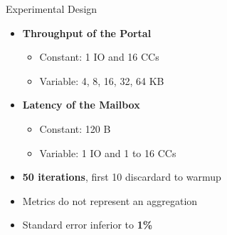 	\begin{frame}[fragile]{Experimental Design}
		\begin{itemize}
			\item \textbf{Throughput of the Portal}
			\begin{itemize}
				\item Constant: 1 IO and 16 CCs
				\item Variable: 4, 8, 16, 32, 64 KB
			\end{itemize}
		\end{itemize}

		\begin{itemize}
			\item \textbf{Latency of the Mailbox}
			\begin{itemize}
				\item Constant: 120 B
				\item Variable: 1 IO and 1 to 16 CCs
			\end{itemize}
		\end{itemize}

		\begin{itemize}
			\item \textbf{50 iterations}, first 10 discardard to warmup
			\item Metrics do not represent an aggregation
			\item Standard error inferior to \textbf{1\%}
		\end{itemize}

	\end{frame}

